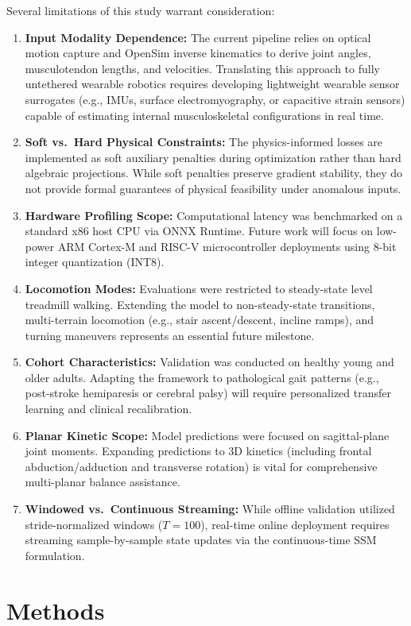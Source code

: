 \documentclass[fleqn,10pt]{wlscirep}
\begin{document}
Several limitations of this study warrant consideration:
\begin{enumerate}
\item \textbf{Input Modality Dependence:} The current pipeline relies on optical motion capture and OpenSim inverse kinematics to derive joint angles, musculotendon lengths, and velocities. Translating this approach to fully untethered wearable robotics requires developing lightweight wearable sensor surrogates (e.g., IMUs, surface electromyography, or capacitive strain sensors) capable of estimating internal musculoskeletal configurations in real time.
\item \textbf{Soft vs.\ Hard Physical Constraints:} The physics-informed losses are implemented as soft auxiliary penalties during optimization rather than hard algebraic projections. While soft penalties preserve gradient stability, they do not provide formal guarantees of physical feasibility under anomalous inputs.
\item \textbf{Hardware Profiling Scope:} Computational latency was benchmarked on a standard x86 host CPU via ONNX Runtime. Future work will focus on low-power ARM Cortex-M and RISC-V microcontroller deployments using 8-bit integer quantization (INT8).
\item \textbf{Locomotion Modes:} Evaluations were restricted to steady-state level treadmill walking. Extending the model to non-steady-state transitions, multi-terrain locomotion (e.g., stair ascent/descent, incline ramps), and turning maneuvers represents an essential future milestone.
\item \textbf{Cohort Characteristics:} Validation was conducted on healthy young and older adults. Adapting the framework to pathological gait patterns (e.g., post-stroke hemiparesis or cerebral palsy) will require personalized transfer learning and clinical recalibration.
\item \textbf{Planar Kinetic Scope:} Model predictions were focused on sagittal-plane joint moments. Expanding predictions to 3D kinetics (including frontal abduction/adduction and transverse rotation) is vital for comprehensive multi-planar balance assistance.
\item \textbf{Windowed vs.\ Continuous Streaming:} While offline validation utilized stride-normalized windows ($T=100$), real-time online deployment requires streaming sample-by-sample state updates via the continuous-time SSM formulation.
\end{enumerate}

\section{Methods}
\end{document}
